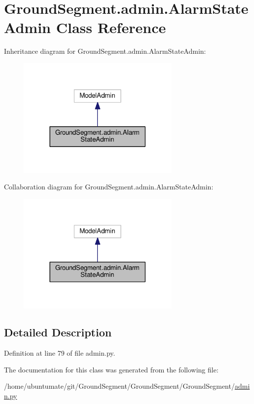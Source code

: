 \hypertarget{class_ground_segment_1_1admin_1_1_alarm_state_admin}{}\section{Ground\+Segment.\+admin.\+Alarm\+State\+Admin Class Reference}
\label{class_ground_segment_1_1admin_1_1_alarm_state_admin}


Inheritance diagram for Ground\+Segment.\+admin.\+Alarm\+State\+Admin\+:\nopagebreak
\begin{figure}[H]
\begin{center}
\leavevmode
\includegraphics[width=225pt]{class_ground_segment_1_1admin_1_1_alarm_state_admin__inherit__graph}
\end{center}
\end{figure}


Collaboration diagram for Ground\+Segment.\+admin.\+Alarm\+State\+Admin\+:\nopagebreak
\begin{figure}[H]
\begin{center}
\leavevmode
\includegraphics[width=225pt]{class_ground_segment_1_1admin_1_1_alarm_state_admin__coll__graph}
\end{center}
\end{figure}


\subsection{Detailed Description}


Definition at line 79 of file admin.\+py.



The documentation for this class was generated from the following file\+:\begin{DoxyCompactItemize}
\item 
/home/ubuntumate/git/\+Ground\+Segment/\+Ground\+Segment/\+Ground\+Segment/\hyperlink{admin_8py}{admin.\+py}\end{DoxyCompactItemize}
